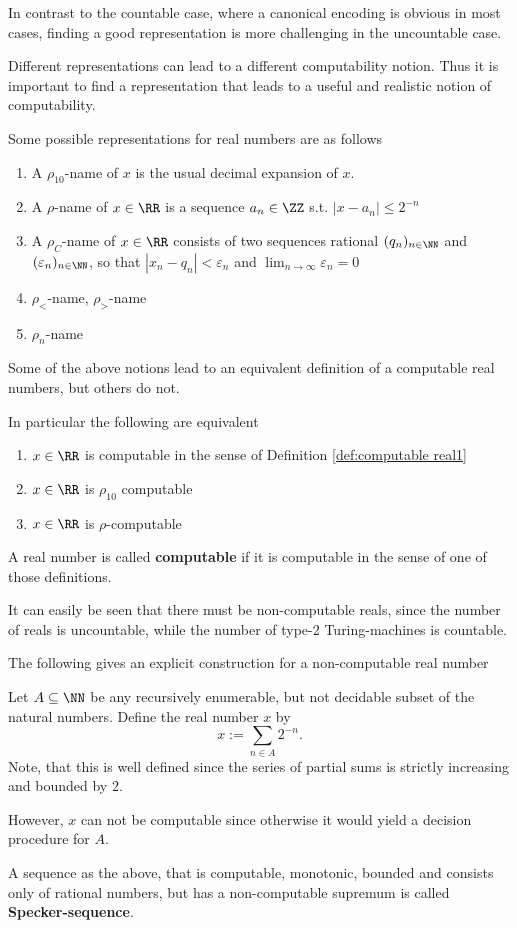 In contrast to the countable case, where a canonical encoding is obvious in most
cases, finding a good representation is more challenging in the uncountable
case.

Different representations can lead to a different computability notion.
Thus it is important to find a representation that leads to a useful and
realistic notion of computability.

Some possible representations for real numbers are as follows
\begin{enumerate}
\item A $\rho_{10}$-name of $x$ is the usual decimal expansion of $x$.
\item A $\rho$-name of $x \in \RR$ is a sequence $a_n \in \ZZ$ s.t. $| x - a_n | \leq 2^{-n}$
\item  A $\rho_C$-name of $x \in \RR$ consists of two sequences rational $(q_n)_{n \in \NN}$ and $(\varepsilon_n)_{n \in \NN}$, so that 
$| x_n - q_n | < \varepsilon_n$ and $\lim_{n \to \infty} \varepsilon_n = 0$  
\item $\rho_<$-name, $\rho_>$-name
\item $\rho_n$-name 
\end{enumerate}
Some of the above notions lead to an equivalent definition of a computable real
numbers, but others do not.

In particular the following are equivalent
\begin{enumerate}
  \item $x \in \RR$ is computable in the sense of Definition
    \ref{def:computable real1}
  \item $x \in \RR$ is $\rho_{10}$ computable
  \item $x \in \RR$ is $\rho$-computable
\end{enumerate}
A real number is called \textbf{computable} if it is computable in the sense of one of
those definitions.

It can easily be seen that there must be non-computable reals, since the number
of reals is uncountable, while the number of type-2 Turing-machines is
countable.

The following gives an explicit construction for a non-computable real number
\begin{example}
Let $A \subseteq \NN$ be any recursively enumerable, but not decidable subset
of the natural numbers.
Define the real number $x$ by
$$ x := \sum_{n \in A} 2^{-n}. $$
Note, that this is well defined since the series of partial sums is strictly
increasing and bounded by $2$.

However, $x$ can not be computable since otherwise it would yield a decision
procedure for $A$. 
\end{example}
A sequence as the above, that is computable, monotonic, bounded and consists
only of rational numbers, but has a non-computable supremum is called \textbf{Specker-sequence}.

